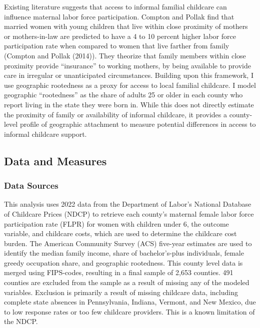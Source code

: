 \documentclass[
  letterpaper,
  DIV=11,
  numbers=noendperiod]{scrartcl}
\begin{document}
Existing literature suggests that access to informal familial childcare
can influence maternal labor force participation. Compton and Pollak
find that married women with young children that live within close
proximity of mothers or mothers-in-law are predicted to have a 4 to 10
percent higher labor force participation rate when compared to women
that live farther from family (Compton and Pollak (2014)). They theorize
that family members within close proximity provide ``insurance'' to
working mothers, by being available to provide care in irregular or
unanticipated circumstances. Building upon this framework, I use
geographic rootedness as a proxy for access to local familial childcare.
I model geographic ``rootedness'' as the share of adults 25 or older in
each county who report living in the state they were born in. While this
does not directly estimate the proximity of family or availability of
informal childcare, it provides a county-level profile of geographic
attachment to measure potential differences in access to informal
childcare support.

\subsection{Data and Measures}\label{data-and-measures}

\subsubsection{Data Sources}\label{data-sources}

This analysis uses 2022 data from the Department of Labor's National
Database of Childcare Prices (NDCP) to retrieve each county's maternal
female labor force participation rate (FLPR) for women with children
under 6, the outcome variable, and childcare costs, which are used to
determine the childcare cost burden. The American Community Survey (ACS)
five-year estimates are used to identify the median family income, share
of bachelor's-plus individuals, female greedy occupation share, and
geographic rootedness. This county level data is merged using
FIPS-codes, resulting in a final sample of 2,653 counties. 491 counties
are excluded from the sample as a result of missing any of the modeled
variables. Exclusion is primarily a result of missing childcare data,
including complete state absences in Pennsylvania, Indiana, Vermont, and
New Mexico, due to low response rates or too few childcare providers.
This is a known limitation of the NDCP.
\end{document}
